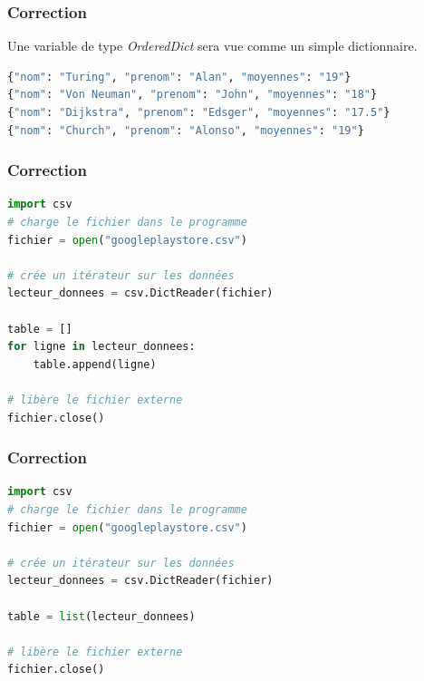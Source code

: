 \documentclass[svgnames,11pt]{beamer}
\begin{document}
\begin{frame}[fragile]
    \frametitle{Correction}

    \begin{aretenir}[Commentaire]
        Une variable de type \emph{OrderedDict} sera vue comme un simple dictionnaire.
    \end{aretenir}
    \begin{center}
        \begin{lstlisting}[language=Python, basicstyle=\small]
{"nom": "Turing", "prenom": "Alan", "moyennes": "19"}
{"nom": "Von Neuman", "prenom": "John", "moyennes": "18"}
{"nom": "Dijkstra", "prenom": "Edsger", "moyennes": "17.5"}
{"nom": "Church", "prenom": "Alonso", "moyennes": "19"}

\end{lstlisting}
        \label{CODE}
    \end{center}
\end{frame}

\begin{frame}[fragile]
    \frametitle{Correction}

    \begin{center}
        \begin{lstlisting}[language=Python]
import csv
# charge le fichier dans le programme
fichier = open("googleplaystore.csv")

# crée un itérateur sur les données
lecteur_donnees = csv.DictReader(fichier)

table = []
for ligne in lecteur_donnees:
    table.append(ligne)

# libère le fichier externe
fichier.close()
\end{lstlisting}
        \label{CODE}
    \end{center}

\end{frame}

\begin{frame}[fragile]
    \frametitle{Correction}

    \begin{center}
        \begin{lstlisting}[language=Python]
import csv
# charge le fichier dans le programme
fichier = open("googleplaystore.csv")

# crée un itérateur sur les données
lecteur_donnees = csv.DictReader(fichier)

table = list(lecteur_donnees)

# libère le fichier externe
fichier.close()
\end{lstlisting}
        \label{CODE}
    \end{center}

\end{frame}
\end{document}
